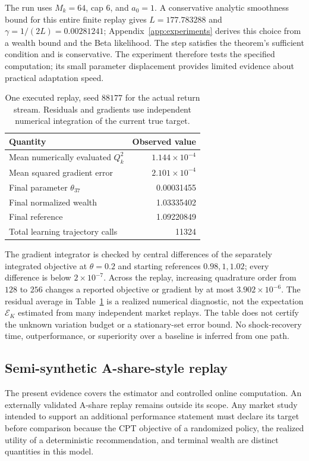 \documentclass[11pt]{article}
\newcommand{\1}{\mathbf 1}
\begin{document}
The run uses $M_k=64$, cap $6$, and $a_0=1$. A conservative analytic smoothness bound for this entire finite replay gives $L=177.783288$ and $\gamma=1/(2L)=0.00281241$; Appendix~\ref{app:experiments} derives this choice from a wealth bound and the Beta likelihood. The step satisfies the theorem's sufficient condition and is conservative. The experiment therefore tests the specified computation; its small parameter displacement provides limited evidence about practical adaptation speed.

\begin{table}[htbp]
\centering\small
\caption{One executed replay, seed $88177$ for the actual return stream. Residuals and gradients use independent numerical integration of the current true target.}\label{tab:replay}
\begin{tabular}{lr}
\toprule Quantity & Observed value\\\midrule
Mean numerically evaluated $Q_k^2$ & $1.144\times10^{-4}$ \\
Mean squared gradient error & $2.101\times10^{-4}$ \\
Final parameter $\theta_{37}$ & 0.00031455 \\
Final normalized wealth & 1.03335402 \\
Final reference & 1.09220849 \\
Total learning trajectory calls & 11324 \\
\bottomrule
\end{tabular}
\end{table}

The gradient integrator is checked by central differences of the separately integrated objective at $\theta=0.2$ and starting references $0.98,1,1.02$; every difference is below $2\times10^{-7}$. Across the replay, increasing quadrature order from $128$ to $256$ changes a reported objective or gradient by at most $3.902\times10^{-6}$. The residual average in Table~\ref{tab:replay} is a realized numerical diagnostic, not the expectation $\mathcal E_K$ estimated from many independent market replays. The table does not certify the unknown variation budget or a stationary-set error bound. No shock-recovery time, outperformance, or superiority over a baseline is inferred from one path.

\subsection{Semi-synthetic A-share-style replay}
The present evidence covers the estimator and controlled online computation. An externally validated A-share replay remains outside its scope. Any market study intended to support an additional performance statement must declare its target before comparison because the CPT objective of a randomized policy, the realized utility of a deterministic recommendation, and terminal wealth are distinct quantities in this model.
\end{document}
